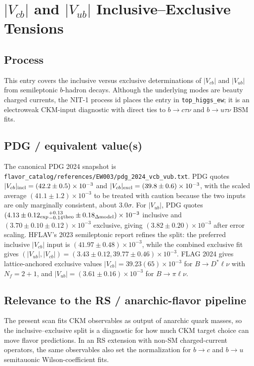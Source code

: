 
\section{\texorpdfstring{\(|V_{cb}|\) and \(|V_{ub}|\) Inclusive--Exclusive Tensions}{Vcb and Vub Inclusive--Exclusive Tensions}}

\subsection*{Process}
This entry covers the inclusive versus exclusive determinations of
\(|V_{cb}|\) and \(|V_{ub}|\) from semileptonic \(b\)-hadron decays.
Although the underlying modes are beauty charged currents, the NIT-1 process
id places the entry in \texttt{top\_higgs\_ew}; it is an electroweak CKM-input
diagnostic with direct ties to \(b\to c\tau\nu\) and \(b\to u\tau\nu\) BSM
fits.

\subsection*{PDG / equivalent value(s)}
The canonical PDG 2024 snapshot is
\texttt{flavor\_catalog/references/EW003/pdg\_2024\_vcb\_vub.txt}.  PDG quotes
\(|V_{cb}|_{\rm incl}=(42.2\pm0.5)\times10^{-3}\) and
\(|V_{cb}|_{\rm excl}=(39.8\pm0.6)\times10^{-3}\), with the scaled average
\((41.1\pm1.2)\times10^{-3}\) to be treated with caution because the two inputs
are only marginally consistent, about \(3.0\sigma\).  For \(|V_{ub}|\), PDG
quotes \((4.13\pm0.12_{\rm exp}{}^{+0.13}_{-0.14}{}_{\rm theo}
\pm0.18_{\Delta{\rm model}})\times10^{-3}\) inclusive and
\((3.70\pm0.10\pm0.12)\times10^{-3}\) exclusive, giving
\((3.82\pm0.20)\times10^{-3}\) after error scaling.  HFLAV's 2023
semileptonic report refines the split: the preferred inclusive
\(|V_{cb}|\) input is \((41.97\pm0.48)\times10^{-3}\), while the combined
exclusive fit gives \((|V_{ub}|,|V_{cb}|)=
(3.43\pm0.12,39.77\pm0.46)\times10^{-3}\).  FLAG 2024 gives lattice-anchored
exclusive values \(|V_{cb}|=39.23(65)\times10^{-3}\) for
\(B\to D^*\ell\nu\) with \(N_f=2+1\), and
\(|V_{ub}|=(3.61\pm0.16)\times10^{-3}\) for \(B\to\pi\ell\nu\).

\subsection*{Relevance to the RS / anarchic-flavor pipeline}
The present scan fits CKM observables as output of anarchic quark masses, so
the inclusive--exclusive split is a diagnostic for how much CKM target choice
can move flavor predictions.  In an RS extension with non-SM charged-current
operators, the same observables also set the normalization for \(b\to c\) and
\(b\to u\) semitauonic Wilson-coefficient fits.

